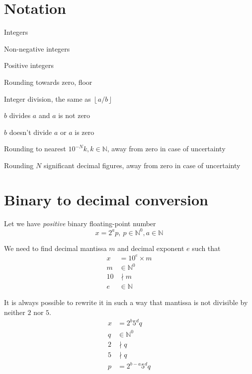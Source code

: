 \documentclass[english]{article}
\newcommand{\idiv}{\backslash}
\newcommand{\llb}{\llbracket}
\newcommand{\rrb}{\rrbracket}
\begin{document}
\section{Notation}

\begin{description}[leftmargin=!, labelwidth=1cm]
    \item [$\mathbb{N}$]                  Integers
    \item [$\mathbb{N}^0$]                Non-negative integers
    \item [$\mathbb{N}^+$]                Positive integers
    \item [$\lfloor a \rfloor$]           Rounding towards zero, floor
    \item [$a \idiv b$]                   Integer division, the same as $\left\lfloor a/b \right\rfloor$
    \item [$b \mid a$]                    $b$ divides $a$ and $a$ is not zero
    \item [$b \nmid a$]                   $b$ doesn't divide $a$ or $a$ is zero
    \item [{$\left[a \right]_N$}]         Rounding to nearest $10^{-N}k, k \in \mathbb{N}$, away from zero in case of uncertainty
    \item [{$\left\llb a \right\rrb_N$}]  Rounding $N$ significant decimal figures, away from zero in case of uncertainty
\end{description}

\section{Binary to decimal conversion}

Let we have \emph{positive} binary floating-point number
\begin{equation}
    x = 2^{a}p,\: p \in \mathbb{N}^0, a \in \mathbb{N}
\end{equation}

We need to find decimal mantissa $m$ and decimal exponent $e$ such that
\begin{align*}
    x & = 10^e \times m \\
    m & \in \mathbb{N}^0 \\
    10 & \nmid m \\
    e & \in \mathbb{N}
\end{align*}

It is always possible to rewrite it in such a way
that mantissa is not divisible by neither $2$ nor $5$.
\begin{align}
    x & = 2^b 5^d q \label{canon} \\
    q & \in \mathbb{N}^0 \nonumber \\
    2 & \nmid q \nonumber \\
    5 & \nmid q \nonumber \\
    p & = 2^{b-a} 5^d q \nonumber
\end{align}
\end{document}
